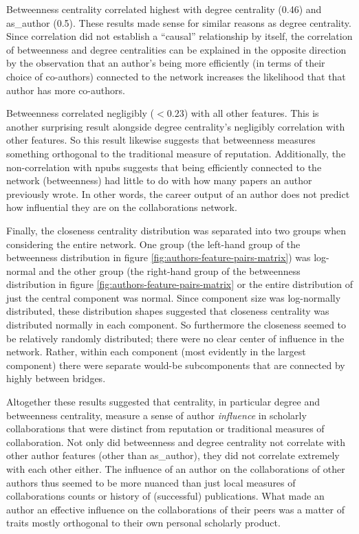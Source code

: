 \documentclass{article}
\begin{document}
Betweenness centrality correlated highest with degree centrality (0.46) and as\_author (0.5).
These results made sense for similar reasons as degree centrality.
Since correlation did not establish a ``causal'' relationship by itself, the correlation of betweenness and degree centralities can be explained in the opposite direction by the observation that an author's being more efficiently (in terms of their choice of co-authors) connected to the network increases the likelihood that that author has more co-authors.

Betweenness correlated negligibly ($< 0.23$) with all other features.
This is another surprising result alongside degree centrality's negligibly correlation with other features.
So this result likewise suggests that betweenness measures something orthogonal to the traditional measure of reputation.
Additionally, the non-correlation with npubs suggests that being efficiently connected to the network (betweenness) had little to do with how many papers an author previously wrote. In other words, the career output of an author does not predict how influential they are on the collaborations network.

Finally, the closeness centrality distribution was separated into two groups when considering the entire network. One group (the left-hand group of the betweenness distribution in figure \ref{fig:authors-feature-pairs-matrix}) was log-normal and the other group (the right-hand group of the betweenness distribution in figure \ref{fig:authors-feature-pairs-matrix} or the entire distribution of just the central component was normal.
Since component size was log-normally distributed, these distribution shapes suggested that closeness centrality was distributed normally in each component.
So furthermore the closeness seemed to be relatively randomly distributed; there were no clear center of influence in the network.
Rather, within each component (most evidently in the largest component) there were separate would-be subcomponents that are connected by highly between bridges.


Altogether these results suggested that centrality, in particular degree and betweenness centrality, measure a sense of author \textit{influence} in scholarly collaborations that were distinct from reputation or traditional measures of collaboration.
Not only did betweenness and degree centrality not correlate with other author features (other than as\_author), they did not correlate extremely with each other either.
The influence of an author on the collaborations of other authors thus seemed to be more nuanced than just local measures of collaborations counts or history of (successful) publications. What made an author an effective influence on the collaborations of their peers was a matter of traits mostly orthogonal to their own personal scholarly product.
\end{document}
